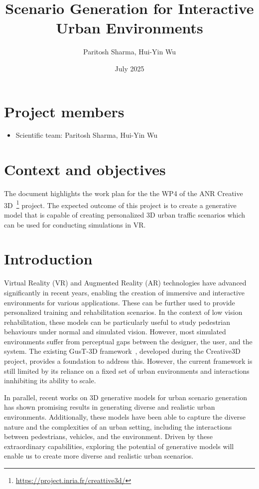 \documentclass{article}
\title{Scenario Generation for Interactive Urban Environments}
\author{Paritosh Sharma, Hui-Yin Wu}
\date{July 2025}
\begin{document}
\maketitle

\section*{Project members}

\begin{itemize}
    \item Scientific team: Paritosh Sharma, Hui-Yin Wu
\end{itemize}

\section{Context and objectives}

The document highlights the work plan for the the WP4 of the ANR Creative 3D~\footnote{\url{https://project.inria.fr/creattive3d/}} project. The expected outcome of this project is to create a generative model that is capable of creating personalized 3D urban traffic scenarios which can be used for conducting simulations in VR.

\section{Introduction}

Virtual Reality (VR) and Augmented Reality (AR) technologies have advanced significantly in recent years, enabling the creation of immersive and interactive environments for various applications. These can be further used to provide personalized training and rehabilitation scenarios. In the context of low vision rehabilitation, these models can be particularly useful to study pedestrian behaviours under normal and simulated vision. However, most simulated environments suffer from perceptual gaps between the designer, the user, and the system. The existing GusT-3D framework~\cite{wu2022designing}, developed during the Creative3D project, provides a foundation to address this. However, the current framework is still limited by its reliance on a fixed set of urban environments and interactions innhibiting its ability to scale.

In parallel, recent works on 3D generative models for urban scenario generation has shown promising results in generating diverse and realistic urban environments. Additionally, these models have been able to capture the diverse nature and the complexities of an urban setting, including the interactions between pedestrians, vehicles, and the environment. Driven by these extraordinary capabilities, exploring the potential of generative models will enable us to create more diverse and realistic urban scenarios.
\end{document}
